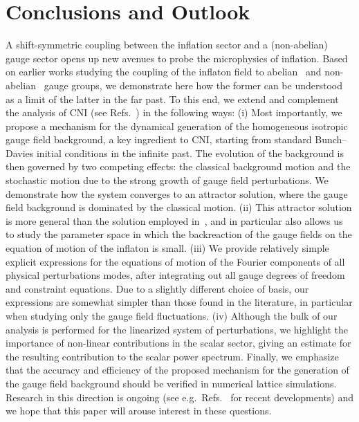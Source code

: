 

\section{Conclusions and Outlook \label{sec:conclusions}}


A shift-symmetric coupling between the inflation sector and a (non-abelian) gauge sector opens up new avenues to probe the microphysics of inflation. Based on earlier works studying the coupling of the inflaton field to abelian~\cite{Barnaby:2010vf} and non-abelian~\cite{Adshead:2012kp,Dimastrogiovanni:2012st,Dimastrogiovanni:2012ew,Adshead:2013qp,Adshead:2013nka} gauge groups, we demonstrate here how the former can be understood as a limit of the latter in the far past. To this end, we extend and complement the analysis of CNI (see Refs.~\cite{Dimastrogiovanni:2012ew,Adshead:2013qp,Adshead:2013nka}) in the following ways: (i) Most importantly, we propose a mechanism for the dynamical generation of the homogeneous isotropic gauge field background, a key ingredient to CNI, starting from standard Bunch--Davies initial conditions in the infinite past. The evolution of the background is then governed by two competing effects: the classical background motion and the stochastic motion due to the strong growth of gauge field perturbations. We demonstrate how the system converges to an attractor solution, where the gauge field background is dominated by the classical motion. (ii) This attractor solution is more general than the solution employed in~\cite{Adshead:2012kp}, and in particular also allows us to study the parameter space in which the backreaction of the gauge fields on the equation of motion of the inflaton is small. (iii) We provide relatively simple explicit expressions for the equations of motion of the Fourier components of all physical perturbations modes, after integrating out all gauge degrees of freedom and constraint equations. Due to a slightly different choice of basis, our expressions are somewhat simpler than those found in the literature, in particular when studying only the gauge field fluctuations. (iv) Although the bulk of our analysis is performed for the linearized system of perturbations, we highlight the importance of non-linear contributions in the scalar sector, giving an estimate for the resulting contribution to the scalar power spectrum. Finally, we emphasize that the accuracy and efficiency of the proposed mechanism for the generation of the gauge field background should be verified in numerical lattice simulations. Research in this direction is ongoing (see e.g.\ Refs.~\cite{Adshead:2015pva,Cuissa:2018oiw} for recent developments) and we hope that this paper will arouse interest in these questions.

